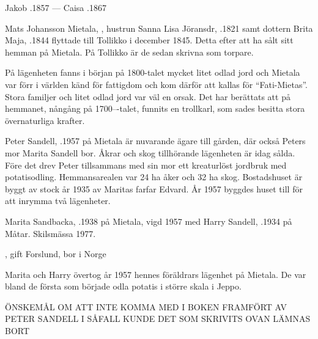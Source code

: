 Jakob .1857  ---  Caisa .1867


%
Mats Johansson Mietala, , hustrun Sanna Lisa Jöransdr, .1821 samt dottern Brita Maja,  .1844 flyttade till Tollikko i december 1845. Detta efter att ha sålt sitt hemman på Mietala. På Tollikko är de sedan skrivna som torpare.

På lägenheten fanns i början på 1800-talet mycket litet odlad jord och Mietala var förr i världen känd för fattigdom och kom därför att kallas för ``Fati-Mietas''. Stora familjer och litet odlad jord var väl en orsak. Det har berättats att på hemmanet, nångång på 1700---talet, funnits en trollkarl, som sades besitta stora övernaturliga krafter.



%



%
Peter Sandell, .1957 på Mietala är nuvarande ägare till gården, där också Peters mor Marita Sandell bor. Åkrar och skog tillhörande lägenheten är idag sålda. Före det drev Peter tillsammans med sin mor ett kreaturlöst jordbruk med potatisodling. Hemmansarealen var 24 ha åker och 32 ha skog. Bostadshuset är byggt av stock år 1935 av Maritas farfar Edvard. År 1957 byggdes huset till för att inrymma två lägenheter.


%
Marita  Sandbacka, .1938 på Mietala, vigd 1957 med Harry Sandell, .1934 på Måtar. Skilsmässa 1977.
\begin{jhchildren}
  \item {}
  \item {}, gift Forslund, bor i Norge
\end{jhchildren}
Marita och Harry övertog år 1957 hennes föräldrars lägenhet på Mietala. De var bland de första som började odla potatis i större skala i Jeppo.

ÖNSKEMÅL OM ATT INTE KOMMA MED I BOKEN FRAMFÖRT AV PETER SANDELL I SÅFALL KUNDE  DET SOM SKRIVITS OVAN LÄMNAS BORT


